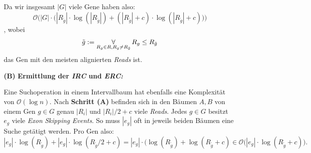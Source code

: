 \documentclass[12pt]{article}
\begin{document}
\begin{itemize}
        Da wir insgesamt $|G|$ viele Gene haben also:
        \[
            \mathcal{O}\Bigg(|G| \cdot \Big(|R_{\tilde g}| \cdot \log(|R_{\tilde g}|) + (|R_{\tilde g}|+c) \cdot \log(|R_{\tilde g}| + c)\Big)\Bigg)
        \]
        , wobei 
        \[
            \tilde g := \operatornamewithlimits\forall_{R_{g} \in R, R_{g} \not =  R_{\tilde g}} R_{g} \le R_{\tilde g}
        \]
        das Gen mit den meisten alignierten \textit{Reads} ist.

    \item[\textbf{(B)}] \textbf{Ermittlung der \textit{IRC} und \textit{ERC:}}

        Eine Suchoperation in einem Intervallbaum hat ebenfalls eine Komplexität von $\mathcal{O}(\log n)$.
        Nach \textbf{Schritt (A)} befinden sich in den Bäumen $A,B$ von einem Gen $g \in G$ genau $|R_{i}|$
        und $|R_{i}|/2 + c$ viele \textit{Reads}.
        Jedes $g \in G$ besitzt $e_{g}$ viele \textit{Exon Skipping Events}. So muss 
        $|e_{g}|$ oft in jeweils beiden Bäumen eine Suche getätigt werden.
        Pro Gen also:
        \[
            |e_{g}| \cdot \log(R_{\tilde g}) + |e_{g}| \cdot \log(R_{\tilde g}/2 + c) = |e_{g}| \cdot  (\log(R_{\tilde g}) + \log(R_{\tilde g} + c) \in \mathcal{O}\Big(|e_{g}| \cdot \log(R_{\tilde g} + c)\Big)
        .\]
\end{itemize}
\end{document}
